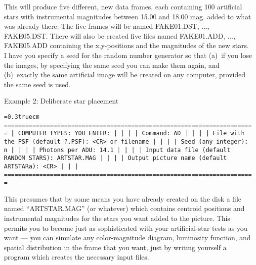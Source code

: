 \noindent This will produce five different, new data frames, each
containing 100 artificial stars with instrumental magnitudes between
15.00 and 18.00 mag. added to what was already there.  The five frames
will be named FAKE01.DST, $\ldots$, FAKE05.DST.  There will also be created
five files named FAKE01.ADD, $\ldots$, FAKE05.ADD containing the
x,y-positions and the magnitudes of the new stars.  I have you specify
a seed for the random number generator so that (a)~if you lose the
images, by specifying the same seed you can make them again, and
(b)~exactly the same artificial image will be created on any computer,
provided the same seed is used.

\vfill
\eject

\noindent Example 2:  Deliberate star placement

\bigskip
{\noindent\obeylines\obeyspaces\frenchspacing\tt\baselineskip=0.3truecm
=======================================================================
| COMPUTER TYPES:                                  YOU ENTER:         |
|                                                                     |
| Command:                                         AD                 |
|                                                                     |
|         File with the PSF (default ?.PSF):       <CR> or filename   |
|                                                                     |
|                        Seed (any integer):       n                  |
|                                                                     |
|                           Photons per ADU:       14.1               |
|                                                                     |
|    Input data file (default RANDOM STARS):       ARTSTAR.MAG        |
|                                                                     |
|    Output picture name (default ARTSTARa):       <CR>               |
|                                                                     |
=======================================================================
}
\bigskip

\noindent This presumes that by some means you have already created on
the disk a file named ``ARTSTAR.MAG'' (or whatever) which contains
centroid positions and instrumental magnitudes for the stars you want
added to the picture.  This permits you to become just as sophisticated
with your artificial-star tests as you want --- you can simulate any
color-magnitude diagram, luminosity function, and spatial distribution
in the frame that you want, just by writing yourself a program which
creates the necessary input files.  

